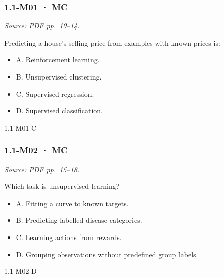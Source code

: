 \noindent\begin{minipage}{\linewidth}

\subsubsection{1.1-M01 · MC}\label{m01-mc}

\emph{Source:
\href{../Lecture\%20Slides/1.1.\%20Fundamentals.pdf\#page=10}{PDF
pp.~10--14}.}

Predicting a house's selling price from examples with known prices is:

\begin{itemize}
\tightlist
\item
  A. Reinforcement learning.
\item
  B. Unsupervised clustering.
\item
  C. Supervised regression.
\item
  D. Supervised classification.
\end{itemize}

\begin{solution}[8mm]{1.1-M01}
C
\end{solution}
\end{minipage}\par\medskip

\noindent\begin{minipage}{\linewidth}

\subsubsection{1.1-M02 · MC}\label{m02-mc}

\emph{Source:
\href{../Lecture\%20Slides/1.1.\%20Fundamentals.pdf\#page=15}{PDF
pp.~15--18}.}

Which task is unsupervised learning?

\begin{itemize}
\tightlist
\item
  A. Fitting a curve to known targets.
\item
  B. Predicting labelled disease categories.
\item
  C. Learning actions from rewards.
\item
  D. Grouping observations without predefined group labels.
\end{itemize}

\begin{solution}[8mm]{1.1-M02}
D
\end{solution}
\end{minipage}\par\medskip


